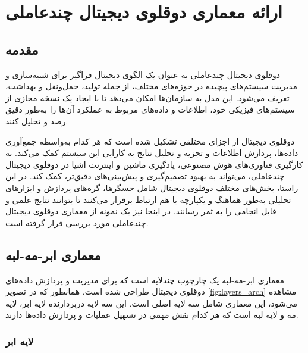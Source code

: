 
\chapter{ارائه معماری دوقلوی دیجیتال چندعاملی}


\section{مقدمه}

دوقلوی دیجیتال چندعاملی به عنوان یک الگوی دیجیتال فراگیر برای شبیه‌سازی و مدیریت سیستم‌های پیچیده در حوزه‌های مختلف، از جمله تولید، حمل‌ونقل و بهداشت، تعریف می‌شود. این مدل به سازمان‌ها امکان می‌دهد تا با ایجاد یک نسخه مجازی از سیستم‌های فیزیکی خود، اطلاعات و داده‌های مربوط به عملکرد آن‌ها را به‌طور دقیق رصد و تحلیل کنند.

دوقلوی دیجیتال از اجزای مختلفی تشکیل شده است که هر کدام به‌واسطه جمع‌آوری داده‌ها، پردازش اطلاعات و تجزیه و تحلیل نتایج به کارایی این سیستم کمک می‌کند. به کارگیری فناوری‌های هوش مصنوعی، یادگیری ماشین و اینترنت اشیا در دوقلوی دیجیتال چندعاملی، می‌تواند به بهبود تصمیم‌گیری و پیش‌بینی‌های دقیق‌تر، کمک کند. در این راستا، بخش‌های مختلف دوقلوی دیجیتال شامل حسگرها، گره‌های پردازش و ابزارهای تحلیلی به‌طور هماهنگ و یکپارچه با هم ارتباط برقرار می‌کنند تا بتوانند نتایج علمی و قابل انجامی را به ثمر رسانند. در اینجا نیز یک نمونه از معماری دوقلوی دیجیتال چندعاملی مورد بررسی قرار گرفته است.
\cite{b15}

\section{معماری ابر-مه-لبه}
معماری ابر-مه-لبه
یک چارچوب چندلایه است که برای مدیریت و پردازش داده‌های دوقلوی دیجیتال طراحی شده است. همانطور که در تصویر \ref{fig:layers_arch} مشاهده‌ می‌شود، این معماری شامل سه لایه اصلی است. این  سه لایه دربردارنده لایه ابر، لایه مه و لایه لبه است که هر کدام نقش مهمی در تسهیل عملیات و پردازش داده‌ها دارند.
\subsection{لایه ابر}

